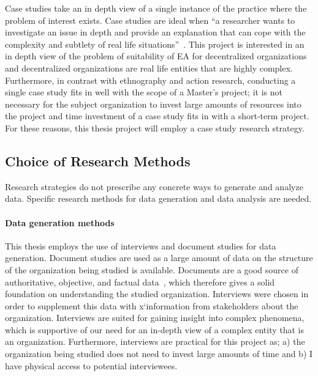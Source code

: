 Case studies take an in depth view of a single instance of the practice where the problem of interest exists. Case studies are ideal when ``a researcher wants to investigate an issue in depth and provide an explanation that can cope with the complexity and subtlety of real life situations''~\cite{denscombe2010good}. This project is interested in an in depth view of the problem of suitability of EA for decentralized organizations and decentralized organizations are real life entities that are highly complex. Furthermore, in contrast with ethnography and action research, conducting a single case study fits in well with the scope of a Master's project; it is not necessary for the subject organization to invest large amounts of resources into the project and time investment of a case study fits in with a short-term project. For these reasons, this thesis project will employ a case study research strategy.  

\subsection{Choice of Research Methods}

Research strategies do not prescribe any concrete ways to generate and analyze data. Specific research methods for data generation and data analysis are needed. 


\paragraph*{Data generation methods}


This thesis employs the use of interviews and document studies for data generation.  Document studies are used as a large amount of data on the structure of the organization being studied is available. Documents are a good source of authoritative, objective, and factual data~\cite{denscombe2010good}, which therefore gives a solid foundation on understanding the studied organization. Interviews were chosen in order to supplement this data with x`information from stakeholders about the organization. Interviews are suited for gaining insight into complex phenomena, which is supportive of our need for an in-depth view of a complex entity that is an organization. Furthermore, interviews are practical for this project as; a) the organization being studied does not need to invest large amounts of time and b) I have physical access to potential interviewees. 

